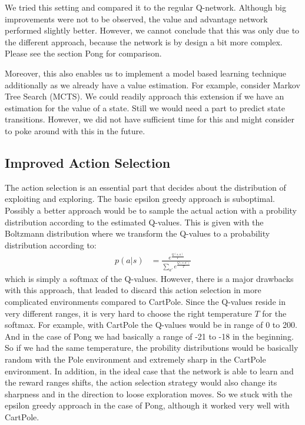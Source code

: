 \documentclass[10pt,a4paper]{article}
\begin{document}
We tried this setting and compared it to the regular Q-network. Although big improvements were not to be observed, the value and advantage network performed slightly better. However, we cannot conclude that this was only due to the different approach, because the network is by design a bit more complex. Please see the section Pong for comparison.

Moreover, this also enables us to implement a model based learning technique additionally as we already have a value estimation. For example, consider Markov Tree Search (MCTS). We could readily approach this extension if we have an estimation for the value of a state. Still we would need a part to predict state transitions. However, we did not have sufficient time for this and might consider to poke around with this in the future.

\subsection{Improved Action Selection}
The action selection is an essential part that decides about the distribution of exploiting and exploring. The basic epsilon greedy approach is suboptimal. Possibly a better approach would be to sample the actual action with a probility distribution according to the estimated Q-values. This is given with the Boltzmann distribution where we transform the Q-values to a probability distribution according to:
\begin{align*}
  p(a | s) &= \frac{e^{\frac{Q(s, a)}{T}}}{\sum_{a'} e^{\frac{Q(s, a')}{T}}}
\end{align*}
which is simply a softmax of the Q-values. However, there is a major drawbacks with this approach, that leaded to discard this action selection in more complicated environments compared to CartPole. Since the Q-values reside in very different ranges, it is very hard to choose the right temperature $T$ for the softmax. For example, with CartPole the Q-values would be in range of 0 to 200. And in the case of Pong we had basically a range of -21 to -18 in the beginning. So if we had the same temperature, the probility distributions would be basically random with the Pole environment and extremely sharp in the CartPole environment. In addition, in the ideal case that the network is able to learn and the reward ranges shifts, the action selection strategy would also change its sharpness and in the direction to loose exploration moves. So we stuck with the epsilon greedy approach in the case of Pong, although it worked very well with CartPole.
\end{document}
